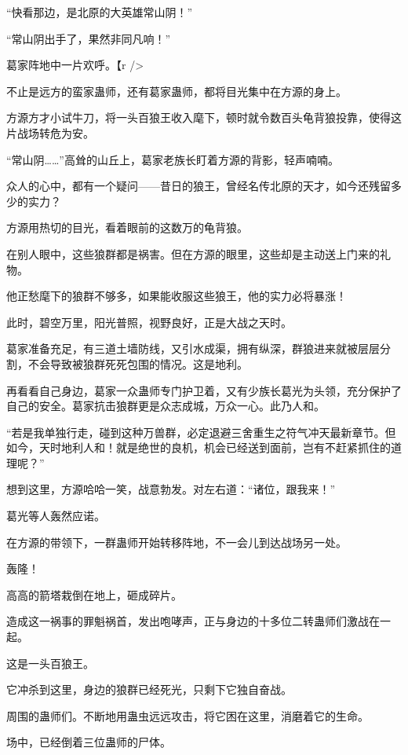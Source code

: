 
\begin{this_body}

“快看那边，是北原的大英雄常山阴！”

“常山阴出手了，果然非同凡响！”

葛家阵地中一片欢呼。【r />

不止是远方的蛮家蛊师，还有葛家蛊师，都将目光集中在方源的身上。

方源方才小试牛刀，将一头百狼王收入麾下，顿时就令数百头龟背狼投靠，使得这片战场转危为安。

“常山阴……”高耸的山丘上，葛家老族长盯着方源的背影，轻声喃喃。

众人的心中，都有一个疑问——昔日的狼王，曾经名传北原的天才，如今还残留多少的实力？

方源用热切的目光，看着眼前的这数万的龟背狼。

在别人眼中，这些狼群都是祸害。但在方源的眼里，这些却是主动送上门来的礼物。

他正愁麾下的狼群不够多，如果能收服这些狼王，他的实力必将暴涨！

此时，碧空万里，阳光普照，视野良好，正是大战之天时。

葛家准备充足，有三道土墙防线，又引水成渠，拥有纵深，群狼进来就被层层分割，不会导致被狼群死死包围的情况。这是地利。

再看看自己身边，葛家一众蛊师专门护卫着，又有少族长葛光为头领，充分保护了自己的安全。葛家抗击狼群更是众志成城，万众一心。此乃人和。

“若是我单独行走，碰到这种万兽群，必定退避三舍重生之符气冲天最新章节。但如今，天时地利人和！就是绝世的良机，机会已经送到面前，岂有不赶紧抓住的道理呢？”

想到这里，方源哈哈一笑，战意勃发。对左右道：“诸位，跟我来！”

葛光等人轰然应诺。

在方源的带领下，一群蛊师开始转移阵地，不一会儿到达战场另一处。

轰隆！

高高的箭塔栽倒在地上，砸成碎片。

造成这一祸事的罪魁祸首，发出咆哮声，正与身边的十多位二转蛊师们激战在一起。

这是一头百狼王。

它冲杀到这里，身边的狼群已经死光，只剩下它独自奋战。

周围的蛊师们。不断地用蛊虫远远攻击，将它困在这里，消磨着它的生命。

场中，已经倒着三位蛊师的尸体。


\end{this_body}

